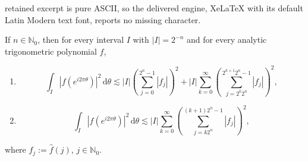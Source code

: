\documentclass[10pt,a4paper]{amsart}
\newcommand{\N}{\mathbb{N}}
\newcommand{\abs}[1]{\left|#1\right|}
\newcommand{\brkt}[1]{\left(#1\right)}
\newcommand{\dd}{\mathrm{d}}
\begin{document}
retained excerpt is pure ASCII, so the delivered engine, XeLaTeX with its default Latin Modern text font, reports no missing character.
\begin{lemma}\label{lem:uncond1}
If $n \in \N_0$, %
then for every interval $I$ with $\abs{I}= 2^{-n}$ and for every analytic trigonometric polynomial $f$, 
\begin{enumerate}
%
\item \label{geometric}
\[    \int_I \left| f( e^{i 2 \pi \theta} ) \right|^2 \, \dd \theta \lesssim  \abs{I}  \brkt{\sum_{j=0}^{2^{n}-1} \abs{f_j}}^2 +
    \abs{I}  \sum_{k=0}^\infty \brkt{\sum_{j=2^k 2^n}^{2^{k+1} 2^{n}-1} \abs{f_j}}^2,
\]
\item \label{arithmetic}
\[    \int_I \left| f( e^{i 2 \pi \theta} ) \right|^2 \, \dd \theta \lesssim 
    \abs{I}  \sum_{k=0}^\infty \brkt{\sum_{j=k2^n}^{(k+1)2^{n}-1} \abs{f_j}}^2,
\]
\end{enumerate}
where $f_j := \widehat{f} (j)$, $j \in \N_0$. 
%
\end{lemma}
\end{document}
